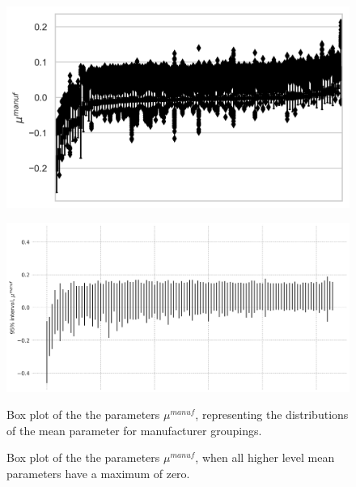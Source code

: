 \documentclass[a4paper]{article}
\begin{document}
\begin{figure}
\begin{minipage}{.45\textwidth}
  \centering
  \includegraphics[width=1\linewidth]{figures/BayManPlot.png}
  \label{fig:BayManPlot}
 \end{minipage}\qquad
\begin{minipage}{.45\textwidth}
  \centering
  \includegraphics[width=1\linewidth]{figures/BayManPlot_const.png}
  \label{fig:BayManPlot_const}
 \end{minipage}

\bigskip

\begin{minipage}[t]{.45\textwidth}
\centering
  \caption{Box plot of the the parameters $\mu^{manuf}$, representing the distributions of the mean parameter for manufacturer groupings.}
\end{minipage}\qquad
\begin{minipage}[t]{.45\textwidth}
\centering
  \caption{Box plot of the the parameters $\mu^{manuf}$, when all higher level mean parameters have a maximum of zero.}
\end{minipage}
\end{figure}
\end{document}
